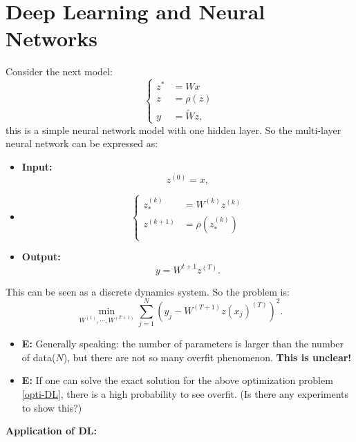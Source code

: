 \section{Deep Learning and Neural Networks}
Consider the next model:
\begin{equation}
    \begin{cases}
        z^* &= Wx \\
        z &= \rho(z) \\
        y &= \tilde{W}z, 
    \end{cases}
\end{equation}
this is a simple neural network model with one hidden layer. So the multi-layer neural network can be expressed as:
\begin{itemize}
    \item {\bf Input:} 
        $$
        z^{(0)} = x,
        $$
    \item 
        \begin{equation}
            \begin{cases}
                z_*^{(k)} &= W^{(k)}z^{(k)} \\
                z^{(k+1)} &= \rho(z_*^{(k)}) \\
            \end{cases}
        \end{equation}
    \item {\bf Output:}
        $$
        y = W^{t+1}z^{(T)}.
        $$
\end{itemize}
This can be seen as a discrete dynamics system. So the problem is:
\begin{equation}\label{opti-DL}
    \min_{W^{(1)}, \cdots, W^{(T+1)}} \sum_{j=1}^N (y_j - W^{(T+1)}z(x_j)^{(T)})^2.
\end{equation}
    \begin{itemize}
        \item {\bf E:} Generally speaking: the number of parameters is larger than the number of data($N$), but there are not so many overfit  phenomenon. {\bf This is unclear!}
        \item {\bf E:} If one can solve the exact solution for the above optimization problem \eqref{opti-DL}, there is a high probability to see overfit. (Is there any experiments to show this?)
    \end{itemize}
{\bf Application of DL:}
